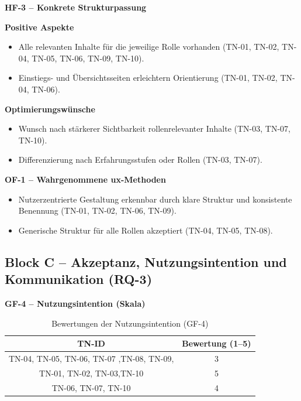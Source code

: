 \vspace{2em}
\textbf{HF-3 -- Konkrete Strukturpassung}

\textbf{Positive Aspekte}
\begin{itemize}
  \item Alle relevanten Inhalte für die jeweilige Rolle vorhanden (TN-01, TN-02, TN-04, TN-05, TN-06, TN-09, TN-10).
  \item Einstiegs- und Übersichtsseiten erleichtern Orientierung (TN-01, TN-02, TN-04, TN-06).
\end{itemize}

\textbf{Optimierungswünsche}
\begin{itemize}
  \item Wunsch nach stärkerer Sichtbarkeit rollenrelevanter Inhalte (TN-03, TN-07, TN-10).
  \item Differenzierung nach Erfahrungsstufen oder Rollen (TN-03, TN-07).
\end{itemize}

\vspace{2em}
\textbf{OF-1 -- Wahrgenommene \Gls{ux}-Methoden}

\begin{itemize}
  \item Nutzerzentrierte Gestaltung erkennbar durch klare Struktur und konsistente Benennung (TN-01, TN-02, TN-06, TN-09).
  \item Generische Struktur für alle Rollen akzeptiert (TN-04, TN-05, TN-08).
\end{itemize}
\newpage
\subsection{Block C -- Akzeptanz, Nutzungsintention und Kommunikation (RQ-3)}

\textbf{GF-4 -- Nutzungsintention (Skala)}

\begin{table}[H]
  \centering
  \caption{Bewertungen der Nutzungsintention (GF-4)}
  \label{tab:BB-gf4}
  \begin{tabular}{c c}
    \toprule
    TN-ID                                     & Bewertung (1--5) \\
    \midrule
    TN-04, TN-05, TN-06, TN-07 ,TN-08, TN-09, & 3                \\
    TN-01, TN-02, TN-03,TN-10                 & 5                \\
    TN-06, TN-07, TN-10                       & 4                \\
    \bottomrule
  \end{tabular}
\end{table}

